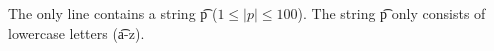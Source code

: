 The only line contains a string \t{p} ($1\le |p| \le 100$). The string \t{p} only consists of lowercase letters (\t{a-z}).
